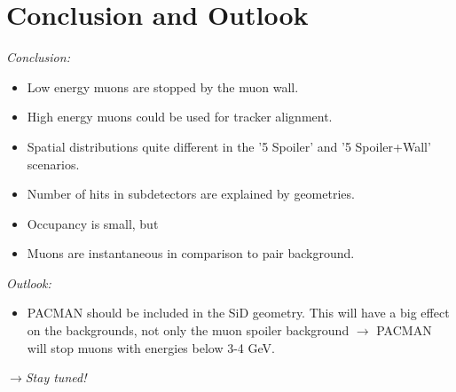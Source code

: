 \documentclass[xcolor={dvipsnames}]{beamer}
\begin{document}
\section{Conclusion and Outlook}
\begin{frame}
\textit{Conclusion:}
\begin{itemize}
\item Low energy muons are stopped by the muon wall.
\item High energy muons could be used for tracker alignment.
\item Spatial distributions quite different in the '5 Spoiler' and '5 Spoiler+Wall' scenarios.
\item Number of hits in subdetectors are explained by geometries.
\item Occupancy is small, but 
\item Muons are instantaneous in comparison to pair background.
\end{itemize}
\textit{Outlook:}
\begin{itemize}
\item PACMAN should be included in the SiD geometry.
This will have a big effect on the backgrounds, not only the muon spoiler background $\rightarrow$ PACMAN will stop muons with energies below 3-4 GeV.
\end{itemize}
\alert{
$\rightarrow$\textit{Stay tuned!}}
\end{frame}
\end{document}
